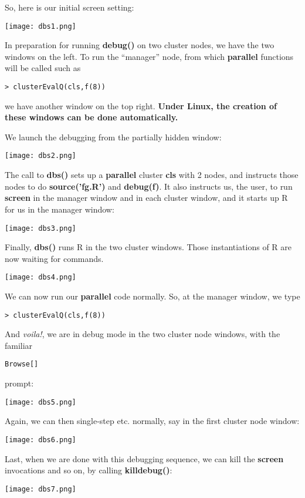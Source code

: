 \documentclass[11pt]{article}\usepackage[]{graphicx}\usepackage[]{color}
\begin{document}
So, here is our initial screen setting:

\texttt{[image: dbs1.png]}

In preparation for running {\bf debug()} on two cluster nodes, we have
the two windows on the left.  To run the ``manager'' node, from which
{\bf parallel} functions will be called such as

\begin{verbatim}
> clusterEvalQ(cls,f(8))
\end{verbatim}

we have another window on the top right. {\bf Under Linux, the
creation of these windows can be done automatically.}

We launch the debugging from the partially hidden window:

\texttt{[image: dbs2.png]}

The call to {\bf dbs()} sets up a {\bf parallel} cluster {\bf cls} with
2 nodes, and instructs those nodes to do {\bf source('fg.R')} and {\bf
debug(f)}.  It also instructs us, the user, to run {\bf screen} in the
manager window and in each cluster window, and it starts up R for us in
the manager window:

\texttt{[image: dbs3.png]}

Finally, {\bf dbs()} runs R in the two cluster windows.  Those
instantiations of R are now waiting for commands. 

\texttt{[image: dbs4.png]}

We can now run our {\bf parallel} code normally.
So, at the manager window, we type

\begin{verbatim}
> clusterEvalQ(cls,f(8))
\end{verbatim}

And {\it voila!}, we are in debug mode in the two cluster node windows,
with the familiar

\begin{verbatim}
Browse[]
\end{verbatim}

prompt:

\texttt{[image: dbs5.png]}

Again, we can then single-step etc. normally, say in the first cluster
node window:

\texttt{[image: dbs6.png]}

Last, when we are done with this debugging sequence, we can kill the
{\bf screen} invocations and so on, by calling {\bf killdebug()}:

\texttt{[image: dbs7.png]}
\end{document}
